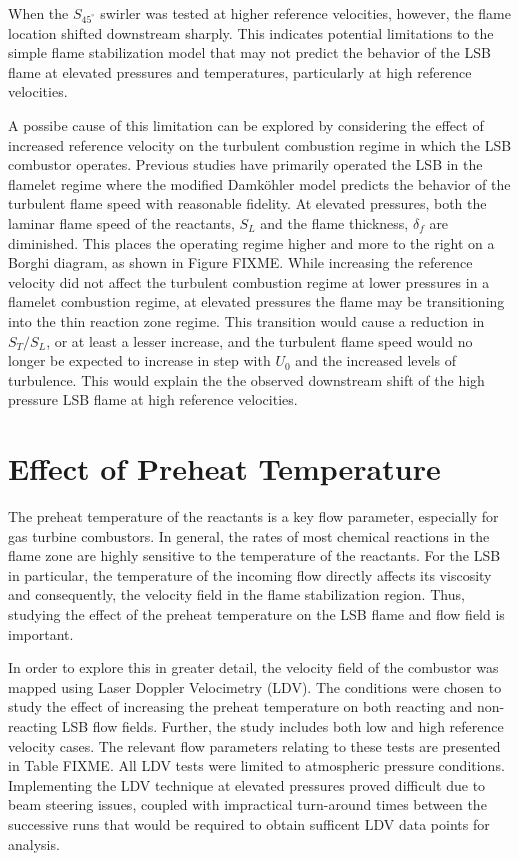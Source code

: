 When the \(S_{45^\circ}\) swirler was tested at higher reference velocities, however, the flame location shifted downstream sharply.
This indicates potential limitations to the simple flame stabilization model that may not predict the behavior of the LSB flame at elevated pressures and temperatures, particularly at high reference velocities.

A possibe cause of this limitation can be explored by considering the effect of increased reference velocity on the turbulent combustion regime in which the LSB combustor operates.
Previous studies have primarily operated the LSB in the flamelet regime where the modified Damk\"ohler model predicts the behavior of the turbulent flame speed with reasonable fidelity.
At elevated pressures, both the laminar flame speed of the reactants, \(S_L\) and the flame thickness, \(\delta_f\) are diminished.
This places the operating regime higher and more to the right on a Borghi diagram, as shown in Figure FIXME.
While increasing the reference velocity did not affect the turbulent combustion regime at lower pressures in a flamelet combustion regime, at elevated pressures the flame may be transitioning into the thin reaction zone regime.
This transition would cause a reduction in \(S_T/S_L\), or at least a lesser increase, and the turbulent flame speed would no longer be expected to increase in step with \(U_0\) and the increased levels of turbulence.
This would explain the the observed downstream shift of the high pressure LSB flame at high reference velocities.

\section{Effect of Preheat Temperature}
\label{sec:lsb-effect-of-preheat-temperature}

The preheat temperature of the reactants is a key flow parameter, especially for gas turbine combustors.
In general, the rates of most chemical reactions in the flame zone are highly sensitive to the temperature of the reactants.
For the LSB in particular, the temperature of the incoming flow directly affects its viscosity and consequently, the velocity field in the flame stabilization region.
Thus, studying the effect of the preheat temperature on the LSB flame and flow field is important.

In order to explore this in greater detail, the velocity field of the combustor was mapped using Laser Doppler Velocimetry (LDV).
The conditions were chosen to study the effect of increasing the preheat temperature on both reacting and non-reacting LSB flow fields.
Further, the study includes both low and high reference velocity cases.
The relevant flow parameters relating to these tests are presented in Table FIXME.
All LDV tests were limited to atmospheric pressure conditions.
Implementing the LDV technique at elevated pressures proved difficult due to beam steering issues, coupled with impractical turn-around times between the successive runs that would be required to obtain sufficent LDV data points for analysis.

